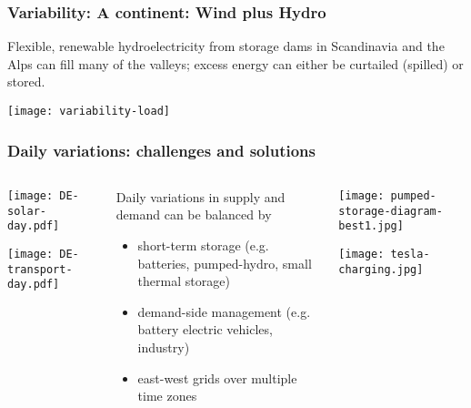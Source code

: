 \documentclass[10pt,aspectratio=169,dvipsnames]{beamer}
\let\olditem\item
\renewcommand{\item}{%
\olditem\vspace{5pt}}
\begin{document}
\begin{frame}
  \frametitle{Variability: A continent: Wind plus Hydro}

  Flexible, renewable hydroelectricity from storage dams in Scandinavia and the Alps can fill many of the valleys; excess energy can either be curtailed (spilled) or stored.

  \centering
  \texttt{[image: variability-load]}


\end{frame}



\begin{frame}
  \frametitle{Daily variations: challenges and solutions}

  \begin{columns}[T]
    \begin{column}{5cm}
      \texttt{[image: DE-solar-day.pdf]}

      \texttt{[image: DE-transport-day.pdf]}
    \end{column}
    \begin{column}{4cm}
      \alert{Daily} variations in supply and demand can be balanced by
      \begin{itemize}
      \item \alert{short-term storage} (e.g. batteries, pumped-hydro, small thermal storage)
      \item \alert{demand-side management} (e.g. battery electric vehicles,
        industry)
      \item \alert{east-west grids over multiple time zones}
      \end{itemize}

    \end{column}
    \begin{column}{5cm}
      \texttt{[image: pumped-storage-diagram-best1.jpg]}

      \vspace{.5cm}

      \texttt{[image: tesla-charging.jpg]}
    \end{column}
  \end{columns}

\end{frame}
\end{document}

